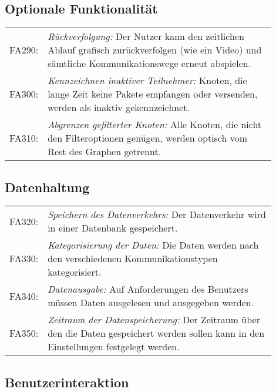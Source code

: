 \subsection{Optionale Funktionalität}
\begin{tabular}{lp{0.9\linewidth}}

FA290: & \textit{Rückverfolgung: }Der Nutzer kann den zeitlichen Ablauf grafisch zurückverfolgen (wie ein Video) und sämtliche Kommunikationswege erneut abspielen. \\

FA300: & \textit{Kennzeichnen inaktiver Teilnehmer: }Knoten, die lange Zeit keine Pakete empfangen oder versenden, werden als inaktiv gekennzeichnet. \\

FA310: & \textit{Abgrenzen gefilterter Knoten: }Alle Knoten, die nicht den Filteroptionen genügen, werden optisch vom Rest des Graphen getrennt. \\

\end{tabular}

\subsection{Datenhaltung}

\begin{tabular}{lp{0.9\linewidth}}

FA320: & \textit{Speichern des Datenverkehrs: }Der Datenverkehr wird in einer Datenbank gespeichert. \\

FA330: & \textit{Kategorisierung der Daten: }Die Daten werden nach den verschiedenen Kommunikationstypen kategorisiert. \\

FA340: & \textit{Datenausgabe: }Auf Anforderungen des Benutzers müssen Daten ausgelesen und ausgegeben werden. \\

FA350: & \textit{Zeitraum der Datenspeicherung: }Der Zeitraum über den die Daten gespeichert werden sollen kann in den Einstellungen festgelegt werden. \\

\end{tabular}

\subsection{Benutzerinteraktion}

